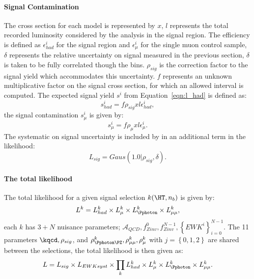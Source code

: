 \paragraph{Signal Contamination} %
\label{par:signal_contamination}
The cross section for each model is represented by $x$, $l$ represents the 
total recorded luminosity considered by the analysis in the signal region. The 
efficiency is defined as $\epsilon^{i}_{had}$ for the signal region and 
$\epsilon^{i}_{\mu}$ for the single muon control sample, $\delta$ represents 
the relative uncertainty on signal measured in the previous section, $\delta$ 
is taken to be fully correlated though the \HT bins. $\rho_{sig}$ is the 
correction factor to the signal yield which accommodates this uncertainty. 
$f$ represents an unknown multiplicative factor on the signal cross 
section, for which an allowed interval is computed.
The expected signal yield $s^{i}$ from Equation~\eqref{eqn:l_had} is defined as:
\begin{equation}
  s^{i}_{had} = f \rho_{sig}xl\epsilon_{had}^{i},
  \label{eqn:sihad}
\end{equation}
the signal contamination $s^{i}_{\mu}$ is given by:
\begin{equation}
  s^{i}_{\mu} = f \rho_{\mu}xl\epsilon_{\mu}^{i}.
  \label{eqn:simu}
\end{equation}
The systematic on signal uncertainty is included by in an additional term in 
the likelihood:
\begin{equation}
  L_{sig} = Gaus\left(1.0|\rho_{sig},\delta \right).
\end{equation}
\paragraph{The total likelihood} %
\label{par:the_total_likelihood}
The total likelihood for a given signal selection $k(\HT,n_b)$ is given by:
\begin{equation}
  L^{k} = L^{k}_{had}\times L^{k}_{\mu} \times L_{\Pphoton}^{k} \times L_{\mu\mu}^{k},
  \label{eqn:totallikelihood}
\end{equation}
each $k$ has $3+N$ nuisance parameters; $\mathcal{A}_{QCD}, f^{0}_{Zinv}, 
f^{N-1}_{Zinv}, \left\{EWK^{i}\right\}^{N-1}_{i=0}$. The 11 parameters $\kqcd, 
\rho_{sig}$, and $\rho_{\Pphoton\PZ}^{k}, \rho_{\mu\mu}^{k}, \rho_{\mu}^{k}$ 
with $j = \left\{0,1,2 \right\}$ are shared between the selections, the total 
likelihood is then given as:
\begin{equation}
  L = L_{sig} \times L_{EWK syst} \times \prod_{k} L^{k}_{had} \times L^{k}_{\mu} \times L^{k}_{\Pphoton} \times L^{k}_{\mu\mu}.
\end{equation}

